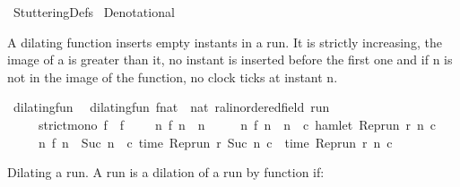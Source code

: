 %
\begin{isabellebody}%
%
%
\isadelimdocument
%
\endisadelimdocument
%
\isatagdocument
%
\isamarkuptrue%
%
\isamarkuptrue%
%
\endisatagdocument
{\isafolddocument}%
%
\isadelimdocument
%
\endisadelimdocument
%
\isadelimtheory
%
\endisadelimtheory
%
\isatagtheory
{}\isamarkupfalse%
\ StutteringDefs\isanewline
\isanewline
{}\ Denotational\isanewline
\isanewline
{}%
\endisatagtheory
{\isafoldtheory}%
%
\isadelimtheory
%
\endisadelimtheory
%
\isadelimdocument
%
\endisadelimdocument
%
\isatagdocument
%
\isamarkuptrue%
%
\endisatagdocument
{\isafolddocument}%
%
\isadelimdocument
%
\endisadelimdocument
%
\begin{isamarkuptext}%
A dilating function inserts empty instants in a run.
  It is strictly increasing, the image of a  is greater than it,
  no instant is inserted before the first one 
  and if n is not in the image of the function, no clock ticks at instant n.%
\end{isamarkuptext}\isamarkuptrue%
\isamarkupfalse%
\ dilating{\isacharunderscore}fun\isanewline
{}\isanewline
\ \ {\isacartoucheopen}dilating{\isacharunderscore}fun\ {\isacharparenleft}f{\isacharcolon}{\isacharcolon}nat\ {\isasymRightarrow}\ nat{\isacharparenright}\ {\isacharparenleft}r{\isacharcolon}{\isacharcolon}{\isacharprime}a{\isacharcolon}{\isacharcolon}linordered{\isacharunderscore}field\ run{\isacharparenright}\isanewline
\ \ \ \ {\isasymequiv}\ strict{\isacharunderscore}mono\ f\ {\isasymand}\ {\isacharparenleft}f\ {}\ {\isacharequal}\ {}{\isacharparenright}\ {\isasymand}\ {\isacharparenleft}{\isasymforall}n{\isachardot}\ f\ n\ {\isasymge}\ n\isanewline
\ \ \ \ {\isasymand}\ {\isacharparenleft}{\isacharparenleft}{\isasymnexists}n\ f\ n\ {\isacharequal}\ n{\isacharparenright}\ {\isasymlongrightarrow}\ {\isacharparenleft}{\isasymforall}c{\isachardot}\ {\isasymnot}{\isacharparenleft}hamlet\ {\isacharparenleft}{\isacharparenleft}Rep{\isacharunderscore}run\ r{\isacharparenright}\ n\ c{\isacharparenright}{\isacharparenright}{\isacharparenright}{\isacharparenright}\isanewline
\ \ \ \ {\isasymand}\ {\isacharparenleft}{\isacharparenleft}{\isasymnexists}n\ f\ n\ {\isacharequal}\ {\isacharparenleft}Suc\ n{\isacharparenright}{\isacharparenright}\ {\isasymlongrightarrow}\ {\isacharparenleft}{\isasymforall}c{\isachardot}\ time\ {\isacharparenleft}{\isacharparenleft}Rep{\isacharunderscore}run\ r{\isacharparenright}\ {\isacharparenleft}Suc\ n{\isacharparenright}\ c{\isacharparenright}\ {\isacharequal}\ time\ {\isacharparenleft}{\isacharparenleft}Rep{\isacharunderscore}run\ r{\isacharparenright}\ n\ c{\isacharparenright}{\isacharparenright}{\isacharparenright}\isanewline
\ \ \ {\isacharparenright}{\isacartoucheclose}%
\begin{isamarkuptext}%
Dilating a run. A run  is a dilation of a run  by function  if:


\end{isamarkuptext}
\end{isabellebody}
